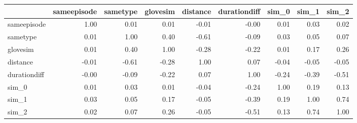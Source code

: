 \begin{tabular}{lrrrrrrrr}
\toprule
{} &  sameepisode &  sametype &  glovesim &  distance &  durationdiff &  sim\_0 &  sim\_1 &  sim\_2 \\
\midrule
sameepisode  &         1.00 &      0.01 &      0.01 &     -0.01 &         -0.00 &   0.01 &   0.03 &   0.02 \\
sametype     &         0.01 &      1.00 &      0.40 &     -0.61 &         -0.09 &   0.03 &   0.05 &   0.07 \\
glovesim     &         0.01 &      0.40 &      1.00 &     -0.28 &         -0.22 &   0.01 &   0.17 &   0.26 \\
distance     &        -0.01 &     -0.61 &     -0.28 &      1.00 &          0.07 &  -0.04 &  -0.05 &  -0.05 \\
durationdiff &        -0.00 &     -0.09 &     -0.22 &      0.07 &          1.00 &  -0.24 &  -0.39 &  -0.51 \\
sim\_0        &         0.01 &      0.03 &      0.01 &     -0.04 &         -0.24 &   1.00 &   0.19 &   0.13 \\
sim\_1        &         0.03 &      0.05 &      0.17 &     -0.05 &         -0.39 &   0.19 &   1.00 &   0.74 \\
sim\_2        &         0.02 &      0.07 &      0.26 &     -0.05 &         -0.51 &   0.13 &   0.74 &   1.00 \\
\bottomrule
\end{tabular}

